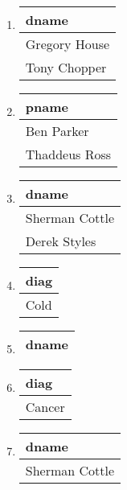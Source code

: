 \documentclass[a4paper,12pt,leqno]{article}
\begin{document}
\begin{enumerate}
\item 
\begin{tabular}{| l |}
    \hline
    dname \\ \hline
    Gregory House \\ 
    Tony Chopper \\ 
    \hline
  \end{tabular}

\item 
\begin{tabular}{| l |}
    \hline
    pname \\ \hline
    Ben Parker \\ 
    Thaddeus Ross \\ 
    \hline
  \end{tabular}
  
\item 
\begin{tabular}{| l |}
    \hline
    dname \\ \hline
    Sherman Cottle \\ 
    Derek Styles \\ 
    \hline
  \end{tabular}
  
\item 
\begin{tabular}{| l |}
    \hline
    diag \\ \hline
    Cold \\ 
    \hline
  \end{tabular}  

\item 
\begin{tabular}{| l |}
    \hline
    dname \\ \hline
  \end{tabular} 

\item
\begin{tabular}{| l |}
    \hline
    diag \\ \hline
    Cancer \\ 
    \hline
  \end{tabular}  

\item 
\begin{tabular}{| l |}
    \hline
    dname \\ \hline
    Sherman Cottle \\ 
    \hline
  \end{tabular}
  

\end{enumerate}
\end{document}
